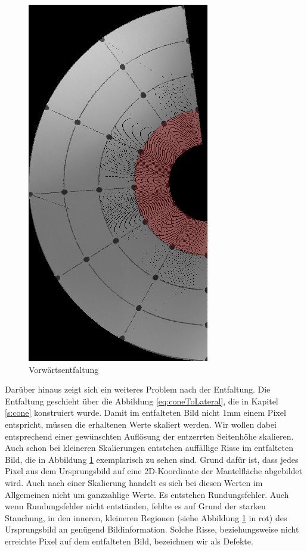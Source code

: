 \begin{figure}[!htb]
	\centering
	\includegraphics[angle=-90, width=.7\textwidth]{images/coneRaspUnWarpForwardHigh.png}
	\caption{Vorwärtsentfaltung}
	\label{fig:forwardHoles}
\end{figure}

Darüber hinaus zeigt sich ein weiteres Problem nach der Entfaltung. Die Entfaltung geschieht über die Abbildung \ref{eq:coneToLateral}, die in Kapitel \ref{s:cone} konstruiert wurde.
Damit im entfalteten Bild nicht 1mm einem Pixel entspricht, müssen die erhaltenen Werte skaliert werden. Wir wollen dabei entsprechend einer gewünschten Auflösung der entzerrten Seitenhöhe skalieren.
Auch schon bei kleineren Skalierungen entstehen auffällige Risse im entfalteten Bild, die in Abbildung \ref{fig:forwardHoles} exemplarisch zu sehen sind. Grund dafür ist, dass jedes Pixel aus dem Ursprungsbild auf eine 2D-Koordinate der Mantelfläche abgebildet wird. Auch nach einer Skalierung handelt es sich bei diesen Werten im Allgemeinen nicht um ganzzahlige Werte. Es entstehen Rundungsfehler. Auch wenn Rundungsfehler nicht entständen, fehlte es auf Grund der starken Stauchung, in den inneren, kleineren Regionen (siehe Abbildung \ref{fig:forwardHoles} in rot) des Ursprungsbild an genügend Bildinformation. Solche Risse, beziehungsweise nicht erreichte Pixel auf dem entfalteten Bild, bezeichnen wir als Defekte.


